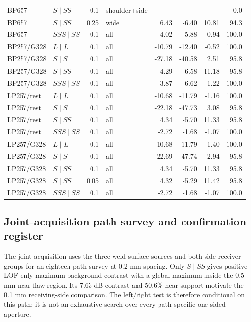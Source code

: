 {\begin{longtable}{@{}llrlrrrr@{}}
BP657 & $S\mid SS$ & 0.1 & shoulder+side & -- & -- & -- & 0.0 \\
BP657 & $S\mid SS$ & 0.25 & wide & 6.43 & -6.40 & 10.81 & 94.3 \\
BP657 & $SSS\mid SS$ & 0.1 & all & -4.02 & -5.88 & -0.94 & 100.0 \\
BP257/G328 & $L\mid L$ & 0.1 & all & -10.79 & -12.40 & -0.52 & 100.0 \\
BP257/G328 & $S\mid S$ & 0.1 & all & -27.18 & -40.58 & 2.51 & 95.8 \\
BP257/G328 & $S\mid SS$ & 0.1 & all & 4.29 & -6.58 & 11.18 & 95.8 \\
BP257/G328 & $SSS\mid SS$ & 0.1 & all & -3.87 & -6.62 & -1.22 & 100.0 \\
LP257/rest & $L\mid L$ & 0.1 & all & -10.68 & -11.79 & -1.16 & 100.0 \\
LP257/rest & $S\mid S$ & 0.1 & all & -22.18 & -47.73 & 3.08 & 95.8 \\
LP257/rest & $S\mid SS$ & 0.1 & all & 4.34 & -5.70 & 11.33 & 95.8 \\
LP257/rest & $SSS\mid SS$ & 0.1 & all & -2.72 & -1.68 & -1.07 & 100.0 \\
LP257/G328 & $L\mid L$ & 0.1 & all & -10.68 & -11.79 & -1.40 & 100.0 \\
LP257/G328 & $S\mid S$ & 0.1 & all & -22.69 & -47.74 & 2.94 & 95.8 \\
LP257/G328 & $S\mid SS$ & 0.1 & all & 4.34 & -5.70 & 11.33 & 95.8 \\
LP257/G328 & $S\mid SS$ & 0.05 & all & 4.32 & -5.29 & 11.42 & 95.8 \\
LP257/G328 & $SSS\mid SS$ & 0.1 & all & -2.72 & -1.68 & -1.07 & 100.0 \\
\end{longtable}}

\subsection{Joint-acquisition path survey and confirmation register}
The joint acquisition uses the three weld-surface sources and both side receiver groups for an eighteen-path survey at 0.2 mm spacing. Only $S\mid SS$ gives positive LOF-only maximum-background contrast with a global maximum inside the 0.5 mm near-flaw region. Its 7.63 dB contrast and 50.6\% near support motivate the 0.1 mm receiving-side comparison. The left/right test is therefore conditional on this path; it is not an exhaustive search over every path-specific one-sided aperture.

